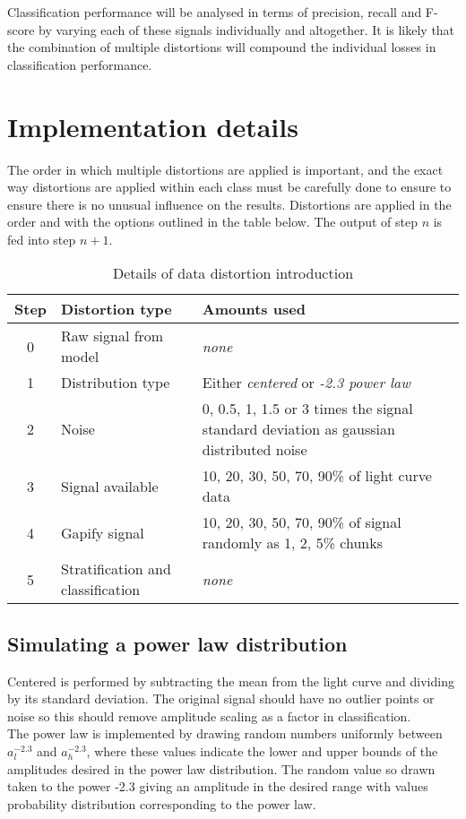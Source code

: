 		Classification performance will be analysed in terms of precision, recall and F-score by varying each of these signals individually and altogether. It is likely that the combination of multiple distortions will compound the individual losses in classification performance.
		
		
		
	\section{Implementation details}
		The order in which multiple distortions are applied is important, and the exact way distortions are applied within each class must be carefully done to ensure to ensure there is no unusual influence on the results. Distortions are applied in the order and with the options outlined in the table below. The output of step $n$ is fed into step $n + 1$.
		
		\begin{table}[ht!]
		\centering
		\begin{tabular}{|c|l|p{}|} \hline
			\textbf{Step} &\textbf{Distortion type} & \textbf{Amounts used} \\ \hline
			0 & Raw signal from model & \emph{none} \\
			1 & Distribution type & Either \emph{centered} or \emph{-2.3 power law} \\
			2 & Noise & 0, 0.5, 1, 1.5 or 3 times the signal standard deviation as gaussian distributed noise\\
			3 & Signal available & 10, 20, 30, 50, 70, 90\% of light curve data \\
			4 & Gapify signal & 10, 20, 30, 50, 70, 90\% of signal randomly as 1, 2, 5\% chunks \\
			5 & Stratification and classification & \emph{none} \\ \hline
		\end{tabular}
		\caption{Details of data distortion introduction}
		\end{table}
		
		\subsection{Simulating a power law distribution}
		Centered is performed by subtracting the mean from the light curve and dividing by its standard deviation. The original signal should have no outlier points or noise so this should remove amplitude scaling as a factor in classification. \\
		The power law is implemented by drawing random numbers uniformly between $a_{l}^{-2.3}$ and $a_{h}^{-2.3}$, where these values indicate the lower and upper bounds of the amplitudes desired in the power law distribution. The random value so drawn taken to the power -2.3 giving an amplitude in the desired range with values probability distribution corresponding to the power law. %
		
